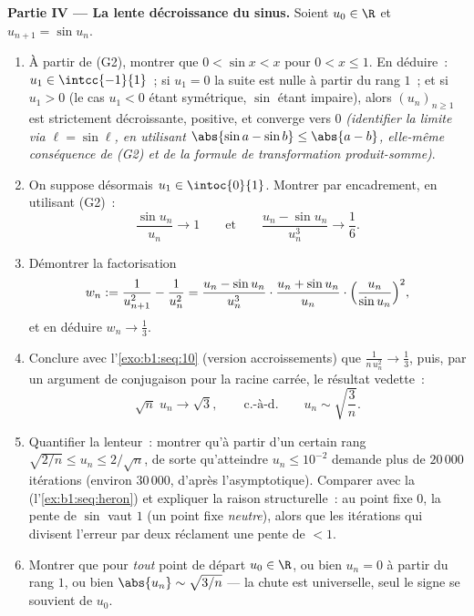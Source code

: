\begin{problem}[{Devoir maison --- le \omterm{pb:b1:seq:1}{théorème de Cesàro--Stolz}
et l'asymptotique $u_n \sim \sqrt{3/n}$ pour $u_{n+1} = \sin
u_n$}]
\medskip
\noindent\textbf{Partie IV --- La lente décroissance du sinus.} Soient
$u_0 \in \R$ et $u_{n+1} = \sin u_n$.
\begin{enumerate}[resume]
  \item À partir de (G2), montrer que $0 < \sin x < x$ pour $0 < x
        \leq 1$. En déduire~: $u_1 \in \intcc{-1}{1}$~; si $u_1 = 0$
        la suite est nulle à partir du rang $1$~; et si $u_1 > 0$ (le
        cas $u_1 < 0$ étant symétrique, $\sin$ étant impaire), alors
        $(u_n)_{n \geq 1}$ est strictement décroissante, positive, et
        converge vers $0$ \emph{(identifier la limite via $\ell =
        \sin \ell$, en utilisant $\abs{\sin a - \sin b} \leq \abs{a -
        b}$, elle-même conséquence de (G2) et de la formule de
        transformation produit-somme)}.
  \item On suppose désormais $u_1 \in \intoc{0}{1}$. Montrer par
        encadrement, en utilisant (G2)~:
        \[
        \frac{\sin u_n}{u_n} \to 1
        \qquad\text{et}\qquad
        \frac{u_n - \sin u_n}{u_n^{3}} \to \frac16 .
        \]
  \item Démontrer la factorisation
        \[
        w_n := \frac{1}{u_{n+1}^{2}} - \frac{1}{u_n^{2}}
        = \frac{u_n - \sin u_n}{u_n^{3}} \cdot
        \frac{u_n + \sin u_n}{u_n} \cdot
        \Bigl(\frac{u_n}{\sin u_n}\Bigr)^{2},
        \]
        et en déduire $w_n \to \frac13$.
  \item Conclure avec l'\cref{exo:b1:seq:10} (version
        accroissements) que $\frac{1}{n\,u_n^{2}} \to \frac13$, puis,
        par un argument de conjugaison pour la racine carrée, le
        résultat vedette~:
        \[
        \sqrt n\;u_n \longrightarrow \sqrt 3 ,
        \qquad\text{c.-à-d.}\qquad
        u_n \sim \sqrt{\frac 3n} .
        \]
  \item Quantifier la lenteur~: montrer qu'à partir d'un certain rang
        $\sqrt{2/n} \leq u_n \leq 2/\sqrt n$, de sorte qu'atteindre
        $u_n \leq 10^{-2}$ demande plus de $20\,000$ itérations
        (environ $30\,000$, d'après l'asymptotique). Comparer avec la
         (l'\cref{ex:b1:seq:heron}) et expliquer la
        raison structurelle~: au point fixe $0$, la pente de $\sin$
        vaut $1$ (un point fixe \emph{neutre}), alors que les
        itérations qui divisent l'erreur par deux réclament une pente
        de  $< 1$.
  \item Montrer que pour \emph{tout} point de départ $u_0 \in \R$,
        ou bien $u_n = 0$ à partir du rang $1$, ou bien $\abs{u_n}
        \sim \sqrt{3/n}$ --- la chute est universelle, seul le signe
        se souvient de $u_0$.
\end{enumerate}


\end{problem}
